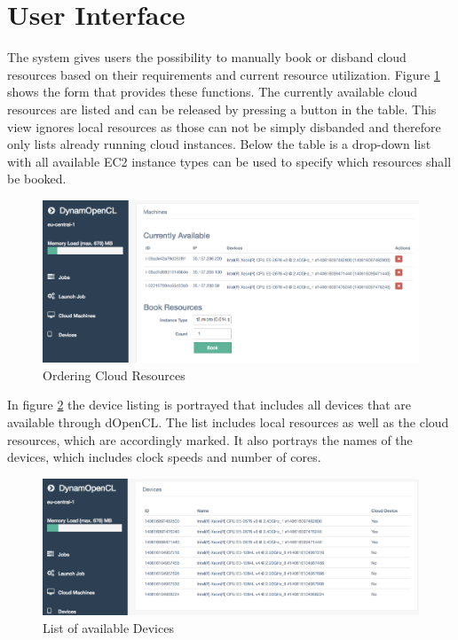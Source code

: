 \section{User Interface}

The system gives users the possibility to manually book or disband cloud resources based on their requirements and current resource utilization. Figure \ref{img:machine_order} shows the form that provides these functions. The currently available cloud resources are listed and can be released by pressing a button in the table. This view ignores local resources as those can not be simply disbanded and therefore only lists already running cloud instances. Below the table is a drop-down list with all available EC2 instance types can be used to specify which resources shall be booked.

\begin{figure}[H]
	\includegraphics[width=1\textwidth]{screenshots/machine_order.png}
	\centering
	\caption{Ordering Cloud Resources}
	\label{img:machine_order}
\end{figure}

In figure \ref{img:available_devices} the device listing is portrayed that includes all devices that are available through dOpenCL. The list includes local resources as well as the cloud resources, which are accordingly marked. It also portrays the names of the devices, which includes clock speeds and number of cores. 

\begin{figure}[H]
	\includegraphics[width=1\textwidth]{screenshots/available_devices.png}
	\centering
	\caption{List of available Devices}
	\label{img:available_devices}
\end{figure}

